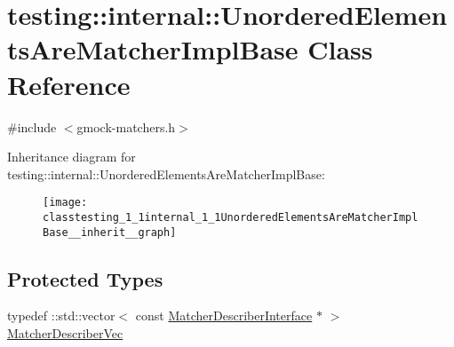 \hypertarget{classtesting_1_1internal_1_1UnorderedElementsAreMatcherImplBase}{}\section{testing\+:\+:internal\+:\+:Unordered\+Elements\+Are\+Matcher\+Impl\+Base Class Reference}
\label{classtesting_1_1internal_1_1UnorderedElementsAreMatcherImplBase}


{\ttfamily \#include $<$gmock-\/matchers.\+h$>$}



Inheritance diagram for testing\+:\+:internal\+:\+:Unordered\+Elements\+Are\+Matcher\+Impl\+Base\+:\nopagebreak
\begin{figure}[H]
\begin{center}
\leavevmode
\texttt{[image: classtesting\_1\_1internal\_1\_1UnorderedElementsAreMatcherImplBase\_\_inherit\_\_graph]}
\end{center}
\end{figure}
\subsection*{Protected Types}
\begin{DoxyCompactItemize}
\item 
typedef \+::std\+::vector$<$ const \hyperlink{classtesting_1_1MatcherDescriberInterface}{Matcher\+Describer\+Interface} $\ast$ $>$ \hyperlink{classtesting_1_1internal_1_1UnorderedElementsAreMatcherImplBase_a81ca7ce793d4b25ce2a7d3e28b48cd64}{Matcher\+Describer\+Vec}
\end{DoxyCompactItemize}
